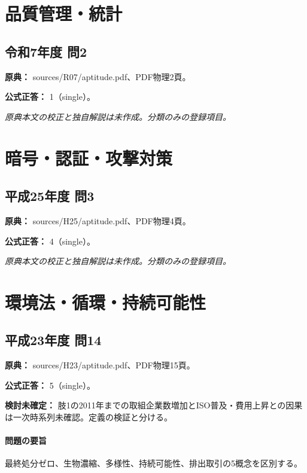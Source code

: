\section{品質管理・統計}

\subsection{令和7年度 問2}
\label{q:r07-reg-apt-02}

\noindent\textbf{原典：} sources/R07/aptitude.pdf、PDF物理2頁。

\textbf{公式正答：} 1（single）。

\par\textit{原典本文の校正と独自解説は未作成。分類のみの登録項目。}

\section{暗号・認証・攻撃対策}

\subsection{平成25年度 問3}
\label{q:h25-reg-apt-03}

\noindent\textbf{原典：} sources/H25/aptitude.pdf、PDF物理4頁。

\textbf{公式正答：} 4（single）。

\par\textit{原典本文の校正と独自解説は未作成。分類のみの登録項目。}

\section{環境法・循環・持続可能性}

\subsection{平成23年度 問14}
\label{q:h23-reg-apt-14}

\noindent\textbf{原典：} sources/H23/aptitude.pdf、PDF物理15頁。

\textbf{公式正答：} 5（single）。

\par\textbf{検討未確定：} 肢1の2011年までの取組企業数増加とISO普及・費用上昇との因果は一次時系列未確認。定義の検証と分ける。

\paragraph{問題の要旨} 最終処分ゼロ、生物濃縮、多様性、持続可能性、排出取引の5概念を区別する。

